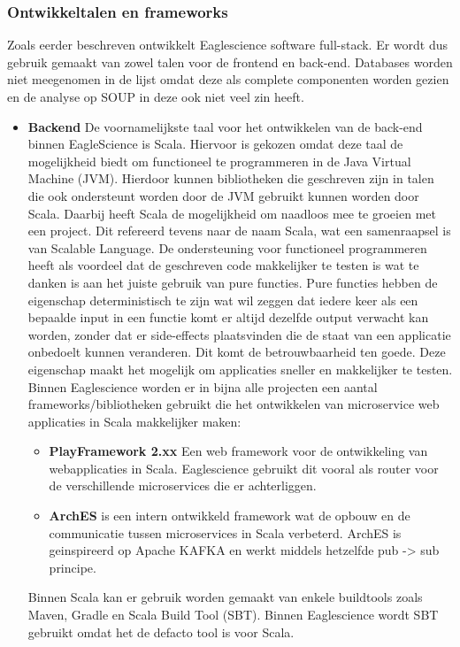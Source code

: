 \subsubsection{Ontwikkeltalen en frameworks}\label{subsubsec:ontwikkeltalen-en-frameworks}
Zoals eerder beschreven ontwikkelt Eaglescience software full-stack. Er wordt dus gebruik gemaakt van zowel talen voor de frontend en back-end. Databases worden niet meegenomen in de lijst omdat deze als complete componenten worden gezien en de analyse op SOUP in deze ook niet veel zin heeft.
\begin{itemize}
    \item \textbf{Backend} De voornamelijkste taal voor het ontwikkelen van de back-end binnen EagleScience is Scala. Hiervoor is gekozen omdat deze taal de mogelijkheid biedt om functioneel te programmeren in de Java Virtual Machine (JVM). Hierdoor kunnen bibliotheken die geschreven zijn in talen die ook ondersteunt worden door de JVM gebruikt kunnen worden door Scala. Daarbij heeft Scala de mogelijkheid om naadloos mee te groeien met een project. Dit refereerd tevens naar de naam Scala, wat een samenraapsel is van Scalable Language. De ondersteuning voor functioneel programmeren heeft als voordeel dat de geschreven code makkelijker te testen is wat te danken is aan het juiste gebruik van pure functies. Pure functies hebben de eigenschap deterministisch te zijn wat wil zeggen dat iedere keer als een bepaalde input in een functie komt er altijd dezelfde output verwacht kan worden, zonder dat er side-effects plaatsvinden die de staat van een applicatie onbedoelt kunnen veranderen. Dit komt de betrouwbaarheid ten goede. Deze eigenschap maakt het mogelijk om applicaties sneller en makkelijker te testen. Binnen Eaglescience worden er in bijna alle projecten een aantal frameworks/bibliotheken gebruikt die het ontwikkelen van microservice web applicaties in Scala makkelijker maken:
    \begin{itemize}
        \item \textbf{PlayFramework 2.xx} Een web framework voor de ontwikkeling van webapplicaties in Scala. Eaglescience gebruikt dit vooral als router voor de verschillende microservices die er achterliggen.
        \item \textbf{ArchES} is een intern ontwikkeld framework wat de opbouw en de communicatie tussen microservices in Scala verbeterd. ArchES is geinspireerd op Apache KAFKA en werkt middels hetzelfde pub -> sub principe.
    \end{itemize} Binnen Scala kan er gebruik worden gemaakt van enkele buildtools zoals Maven, Gradle en Scala Build Tool (SBT). Binnen Eaglescience wordt SBT gebruikt omdat het de defacto tool is voor Scala.

\end{itemize}
